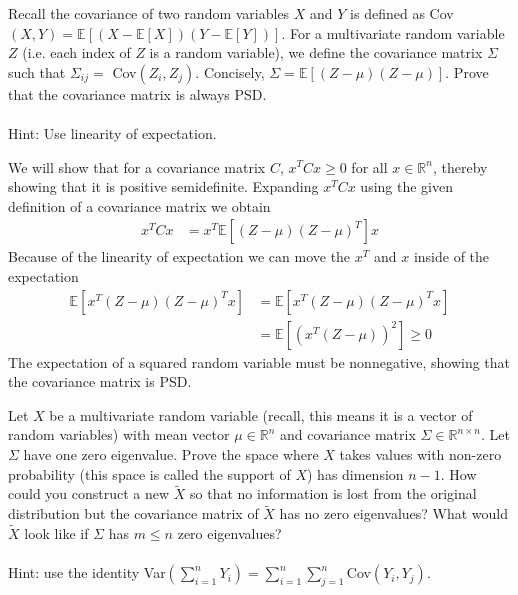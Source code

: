 
\begin{Parts}

\Part
Recall the covariance of two random variables $X$ and $Y$ is defined as Cov$(X, Y) = \mathbb{E}[(X -
\mathbb{E}[X])(Y - \mathbb{E}[Y])]$. For a multivariate random variable $Z$ (i.e. each index of $Z$ is a random
variable), we define the covariance matrix $\Sigma$ such that $\Sigma_{i j} =$ Cov$(Z_i
, Z_j)$. Concisely, $\Sigma =\mathbb{E}[(Z - \mu)(Z - \mu)]$. Prove that the covariance matrix is always PSD. \\ \\
Hint: Use linearity of expectation. 

\begin{solution}

We will show that for a covariance matrix $C$, $x^T C x \geq 0$ for all $x \in \mathbb{R}^n$, thereby showing that it is positive semidefinite. Expanding $x^TCx$ using the given definition of a covariance matrix we obtain
\begin{align*}
x^TCx &= x^T \mathbb{E}[(Z - \mu)(Z - \mu)^T] x
\end{align*}
Because of the linearity of expectation we can move the $x^T$ and $x$ inside of the expectation
\begin{align*}
 \mathbb{E}[x^T(Z - \mu)(Z - \mu)^Tx] &= \mathbb{E}[x^T (Z - \mu)(Z - \mu)^Tx] \\
 &= \mathbb{E}[ (x^T (Z - \mu))^2] \geq 0 
\end{align*} 
The expectation of a squared random variable must be nonnegative, showing that the covariance matrix is PSD. 

\end{solution}

\Part
Let $X$ be a multivariate random variable (recall, this means it is a vector of random variables)
with mean vector $\mu \in \mathbb{R}^n$ and covariance matrix $\Sigma \in \mathbb{R}^{n \times n}$. Let $\Sigma$ have one zero eigenvalue.
Prove the space where $X$ takes values with non-zero probability (this space is called the
support of $X$) has dimension $n - 1$. How could you construct a new $\tilde{X}$ so that no information
is lost from the original distribution but the covariance matrix of $\tilde{X}$ has no zero eigenvalues?
What would $\tilde{X}$ look like if $\Sigma$ has $m \leq n$ zero eigenvalues? \\ \\
Hint: use the identity Var$\left(\sum\limits_{i=1}^n Y_i \right) = \sum\limits_{i=1}^n \sum\limits_{j=1}^n $Cov$(Y_i, Y_j)$.


\end{Parts}
